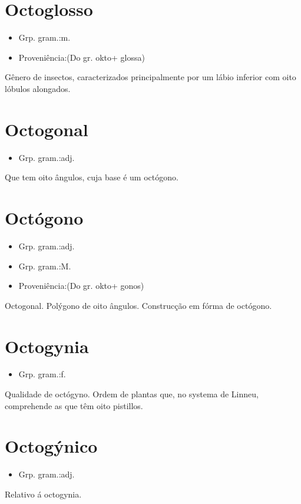 \section{Octoglosso}
\begin{itemize}
\item {Grp. gram.:m.}
\end{itemize}
\begin{itemize}
\item {Proveniência:(Do gr. \textunderscore okto\textunderscore  + \textunderscore glossa\textunderscore )}
\end{itemize}
Gênero de insectos, caracterizados principalmente por um lábio inferior com oito lóbulos alongados.
\section{Octogonal}
\begin{itemize}
\item {Grp. gram.:adj.}
\end{itemize}
Que tem oito ângulos, cuja base é um octógono.
\section{Octógono}
\begin{itemize}
\item {Grp. gram.:adj.}
\end{itemize}
\begin{itemize}
\item {Grp. gram.:M.}
\end{itemize}
\begin{itemize}
\item {Proveniência:(Do gr. \textunderscore okto\textunderscore  + \textunderscore gonos\textunderscore )}
\end{itemize}
Octogonal.
Polýgono de oito ângulos.
Construcção em fórma de octógono.
\section{Octogynia}
\begin{itemize}
\item {Grp. gram.:f.}
\end{itemize}
Qualidade de octógyno.
Ordem de plantas que, no systema de Linneu, comprehende as que têm oito pistillos.
\section{Octogýnico}
\begin{itemize}
\item {Grp. gram.:adj.}
\end{itemize}
Relativo á octogynia.
